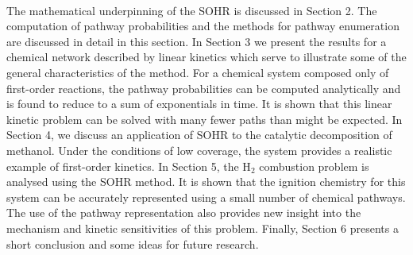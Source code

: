\paragraph{}
The mathematical underpinning of the SOHR is discussed in Section 2. The computation
of pathway probabilities and the methods for pathway enumeration are discussed
in detail in this section. In Section 3 we present the results for a chemical network
described by linear kinetics which serve to illustrate some of the general characteristics
of the method. For a chemical system composed only of first-order reactions, the pathway
probabilities can be computed analytically and is found to reduce to a sum of
exponentials in time. It is shown that this linear kinetic problem can be solved with
many fewer paths than might be expected. In Section 4, we discuss an application of
SOHR to the catalytic decomposition of methanol. Under the conditions of low coverage,
the system provides a realistic example of first-order kinetics. In Section 5, the H$_2$
combustion problem is analysed using the SOHR method. It is shown that the ignition
chemistry for this system can be accurately represented using a small number of chemical
pathways. The use of the pathway representation also provides new insight into the
mechanism and kinetic sensitivities of this problem. Finally, Section 6 presents a short
conclusion and some ideas for future research.


